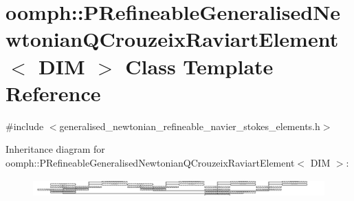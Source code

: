 \hypertarget{classoomph_1_1PRefineableGeneralisedNewtonianQCrouzeixRaviartElement}{}\section{oomph\+:\+:P\+Refineable\+Generalised\+Newtonian\+Q\+Crouzeix\+Raviart\+Element$<$ D\+IM $>$ Class Template Reference}
\label{classoomph_1_1PRefineableGeneralisedNewtonianQCrouzeixRaviartElement}


{\ttfamily \#include $<$generalised\+\_\+newtonian\+\_\+refineable\+\_\+navier\+\_\+stokes\+\_\+elements.\+h$>$}

Inheritance diagram for oomph\+:\+:P\+Refineable\+Generalised\+Newtonian\+Q\+Crouzeix\+Raviart\+Element$<$ D\+IM $>$\+:\begin{figure}[H]
\begin{center}
\leavevmode
\includegraphics[height=0.680300cm]{classoomph_1_1PRefineableGeneralisedNewtonianQCrouzeixRaviartElement}
\end{center}
\end{figure}

